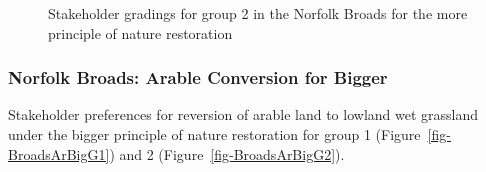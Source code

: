 \documentclass[
  12pt,
  letterpaper,
  DIV=11,
  numbers=noendperiod]{scrartcl}
\begin{document}
\begin{figure}[H]


\caption{\label{fig-BroadsMoreG2}Stakeholder gradings for group 2 in the
Norfolk Broads for the more principle of nature restoration}

\end{figure}%

\newpage{}

\subsubsection{Norfolk Broads: Arable Conversion for
Bigger}\label{norfolk-broads-arable-conversion-for-bigger}

Stakeholder preferences for reversion of arable land to lowland wet
grassland under the bigger principle of nature restoration for group 1
(Figure~\ref{fig-BroadsArBigG1}) and 2 (Figure~\ref{fig-BroadsArBigG2}).
\end{document}
